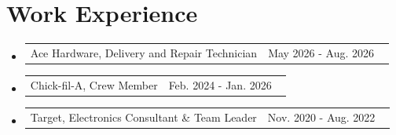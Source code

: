 \documentclass[letterpaper,11pt]{article}
\makeatletter
\newcommand{\resumeSubheadingSoftTwo}[2]{
  \vspace{-8pt}\item
    \begin{tabular*}{\textwidth}{l@{\extracolsep{\fill}}r}
      #1 & #2 \
    \end{tabular*}\vspace{-20pt}
}
\newcommand{\resumeSubHeadingListStart}{\begin{itemize}[leftmargin=0.15in, label={}]}
\newcommand{\resumeSubHeadingListEnd}{\end{itemize}}
\makeatother
\begin{document}
\section{Work Experience}
\resumeSubHeadingListStart
\resumeSubheadingSoftTwo{Ace Hardware, Delivery and Repair Technician}{May 2026 - Aug. 2026}

\resumeSubheadingSoftTwo{Chick-fil-A, Crew Member}{Feb. 2024 - Jan. 2026}

\resumeSubheadingSoftTwo{Target, Electronics Consultant \& Team Leader}{Nov. 2020 - Aug. 2022}
\resumeSubHeadingListEnd
\end{document}

